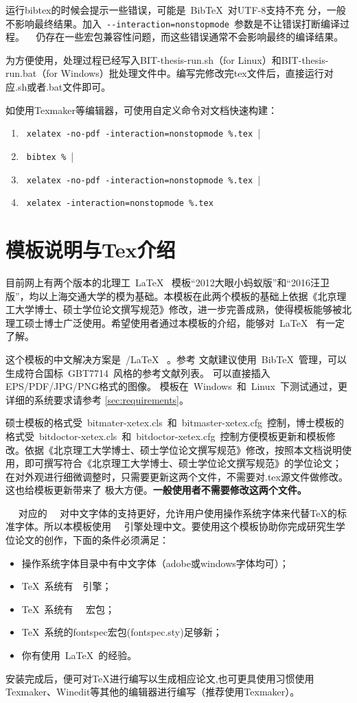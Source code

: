 运行bibtex的时候会提示一些错误，可能是~{{\sc Bib}\TeX}~对UTF-8支持不充
分，一般不影响最终结果。加入~\verb|--interaction=nonstopmode|~参数是不让错误打断编译过程。
\XeTeX~ 仍存在一些宏包兼容性问题，而这些错误通常不会影响最终的编译结果。

为方便使用，处理过程已经写入BIT-thesis-run.sh（for Linux）和BIT-thesis-run.bat（for Windows）批处理文件中。编写完修改完tex文件后，直接运行对应.sh或者.bat文件即可。

如使用Texmaker等编辑器，可使用自定义命令对文档快速构建：

{\color{blue}
\begin{enumerate}
\item[] ~\verb|xelatex -no-pdf -interaction=nonstopmode %.tex ||
\item[] ~\verb|bibtex % || 
\item[] ~\verb|xelatex -no-pdf -interaction=nonstopmode %.tex ||
\item[] ~\verb|xelatex -interaction=nonstopmode %.tex|
\end{enumerate}}


\section{模板说明与Tex介绍}
\label{sec:features}
 
目前网上有两个版本的北理工~\LaTeX~ 模板“2012大眼小蚂蚁版”和“2016汪卫版”，均以上海交通大学的模为基础。本模板在此两个模板的基础上依据《北京理工大学博士、硕士学位论文撰写规范》修改，进一步完善成熟，使得模板能够被北理工硕士博士广泛使用。希望使用者通过本模板的介绍，能够对~\LaTeX~ 有一定了解。

这个模板的中文解决方案是~\XeTeX/\LaTeX~ 。参考
文献建议使用~BibTeX~管理，可以生成符合国标~GBT7714~风格的参考文献列表。
可以直接插入EPS/PDF/JPG/PNG格式的图像。
模板在~Windows~和~Linux~下测试通过，更详细的系统要求请参考
\ref{sec:requirements}。

硕士模板的格式受~bitmater-xetex.cls~和~bitmaster-xetex.cfg~控制，博士模板的格式受~bitdoctor-xetex.cls~和~bitdoctor-xetex.cfg~控制方便模板更新和模板修改。依据《北京理工大学博士、硕士学位论文撰写规范》修改，按照本文档说明使用，即可撰写符合《北京理工大学博士、硕士学位论文撰写规范》的学位论文；
在对外观进行细微调整时，只需要更新这两个文件，不需要对.tex源文件做修改。这也给模板更新带来了
极大方便。\textbf{一般使用者不需要修改这两个文件。}
 
~\XeLaTeX~ 对应的~\XeTeX~ 对中文字体的支持更好，允许用户使用操作系统字体来代替TeX的标准字体。所以本模板使用~\XeLaTeX~ 引擎处理中文。要使用这个模板协助你完成研究生学位论文的创作，下面的条件必须满足：

\begin{itemize}
\item  操作系统字体目录中有中文字体（adobe或windows字体均可）；
\item  \TeX~系统有~\XeTeX~引擎；
\item  \TeX~系统有~ \CTeX~宏包；
\item  \TeX~系统的fontspec宏包(fontspec.sty)足够新；
\item  你有使用~\LaTeX~的经验。
\end{itemize}

安装完成后，便可对\TeX 进行编写以生成相应论文,也可更具使用习惯使用Texmaker、Winedit等其他的编辑器进行编写（推荐使用Texmaker）。



